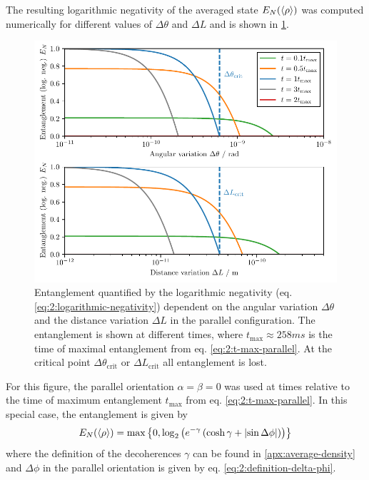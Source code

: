 The resulting logarithmic negativity of the averaged state $E_N(\left\langle\rho\right\rangle)$ was computed numerically for different values of $\Delta \theta$ and $\Delta L$ and is shown in \cref{fig:4:EN-delta-theta}.
\begin{figure}[!htb]
  \centering
  \includegraphics[width=\textwidth]{./../figures/theta-variance/EN-deltaTheta-deltaL.pdf}
  \caption{Entanglement quantified by the logarithmic negativity (eq. \eqref{eq:2:logarithmic-negativity}) dependent on the angular variation $\Delta\theta$ and the distance variation $\Delta L$ in the parallel configuration. The entanglement is shown at different times, where $t_\mathrm{max} \approx 258\si{ms}$ is the time of maximal entanglement from eq. \eqref{eq:2:t-max-parallel}. At the critical point $\Delta \theta_\mathrm{crit}$ or $\Delta L_\mathrm{crit}$ all entanglement is lost.}
  \label{fig:4:EN-delta-theta}
\end{figure}
For this figure, the parallel orientation $\alpha = \beta = 0$ was used at times relative to the time of maximum entanglement $t_\mathrm{max}$ from eq. \eqref{eq:2:t-max-parallel}.
In this special case, the entanglement is given by
\begin{equation}\label{eq:4:log-neg-analytical}
  E_N(\left\langle\rho\right\rangle) = \max\left\{ 0, \log_2\left(e^{-\gamma}\left(\cosh\gamma + \left\lvert\sin \Delta \phi\right\rvert\right)\right) \right\}
\end{equation}
where the definition of the decoherences $\gamma$ can be found in \cref{apx:average-density} and $\Delta \phi$ in the parallel orientation is given by eq. \eqref{eq:2:definition-delta-phi}.
